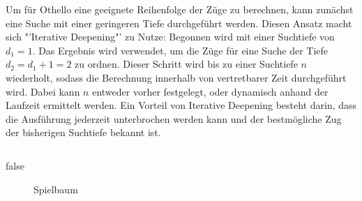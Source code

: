 Um für Othello eine geeignete Reihenfolge der Züge zu berechnen, kann zunächst eine Suche mit einer geringeren Tiefe durchgeführt werden.
Diesen Ansatz macht sich "'Iterative Deepening"' zu Nutze:
Begonnen wird mit einer Suchtiefe von $d_1=1$.
Das Ergebnis wird verwendet, um die Züge für eine Suche der Tiefe $d_2=d_1+1=2$ zu ordnen.
Dieser Schritt wird bis zu einer Suchtiefe $n$ wiederholt, sodass die Berechnung innerhalb von vertretbarer Zeit durchgeführt wird.
Dabei kann $n$ entweder vorher festgelegt, oder dynamisch anhand der Laufzeit ermittelt werden.
Ein Vorteil von Iterative Deepening besteht darin, dass die Ausführung jederzeit unterbrochen werden kann und der bestmögliche Zug der bisherigen Suchtiefe bekannt ist.
\cite{alphabetaefficiency}

\inputminted[xleftmargin=0.3cm,xrightmargin=0.3cm,linenos,frame=lines,bgcolor=lightergray]{python}{listings/alphabeta.py}

\ifx false
\begin{figure}[]
    \centering
    \caption{Spielbaum}
    \label{fig:game_tree}
\end{figure}
\fi


